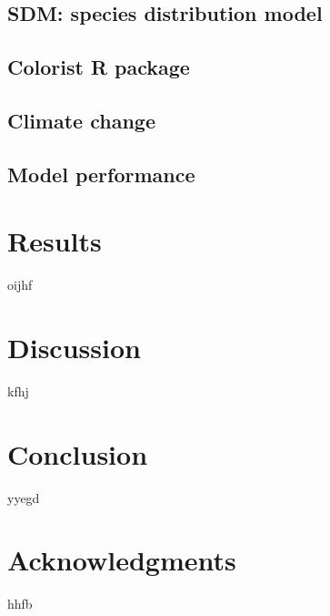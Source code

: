 \documentclass[12pt,a4paper]{article}
\begin{document}
\subsection{SDM: species distribution model}
\subsection{Colorist R package}
\subsection{Climate change}
\subsection{Model performance}

\newpage
\section{Results}
oijhf

\newpage
\section{Discussion}
kfhj

\newpage
\section{Conclusion}

yyegd

\newpage
\section{Acknowledgments}
hhfb




\newpage
\end{document}
